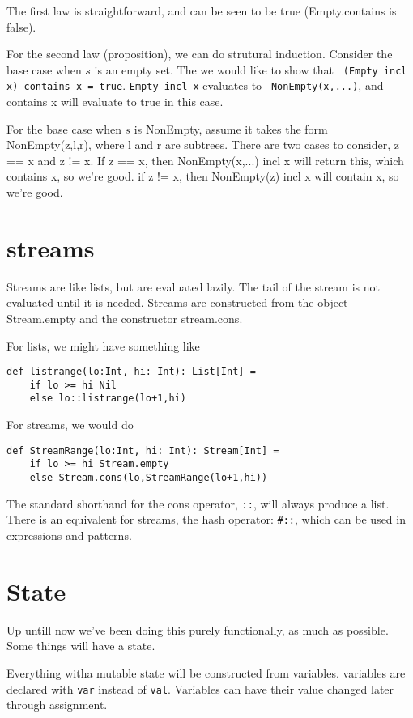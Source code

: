 The first law is straightforward, and can be seen to be true (Empty.contains is false). 

For the second law (proposition), we can do strutural induction. Consider the base case when $s$ is an empty set. The we would like to show that \lstinline| (Empty incl x) contains x = true|. \lstinline|Empty incl x| evaluates to \lstinline| NonEmpty(x,...)|, and contains x will evaluate to true in this case.

For the base case when $s$ is NonEmpty, assume it takes the form NonEmpty(z,l,r), where l and r are subtrees. There are two cases to consider, z == x and z != x. If z == x, then NonEmpty(x,...) incl x will return this, which contains x, so we're good. if z != x, then NonEmpty(z) incl x will contain x, so we're good.
\section{streams}

Streams are like lists, but are evaluated lazily. The tail of the stream is not evaluated until it is needed. Streams are constructed from the object Stream.empty and the constructor stream.cons.

For lists, we might have something like
\begin{lstlisting}
def listrange(lo:Int, hi: Int): List[Int] = 
	if lo >= hi Nil
	else lo::listrange(lo+1,hi)
\end{lstlisting}
For streams, we would do
\begin{lstlisting}
def StreamRange(lo:Int, hi: Int): Stream[Int] = 
	if lo >= hi Stream.empty
	else Stream.cons(lo,StreamRange(lo+1,hi))
\end{lstlisting}

The standard shorthand for the cons operator, \lstinline|::|, will always produce a list. There is an equivalent for streams, the hash operator: \lstinline|#::|, which can be used in expressions and patterns. 

\section{State}
Up untill now we've been doing this purely functionally, as much as possible.
Some things will have a state. 

Everything witha mutable state will be constructed from variables. variables are declared with \lstinline|var| instead of \lstinline|val|. Variables can have their value changed later through assignment.


